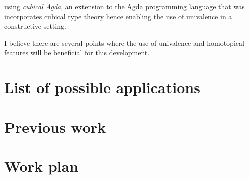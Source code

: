 \documentclass[11pt]{article}
\begin{document}
using \emph{cubical Agda}, an extension to the Agda programming language that was
incorporates cubical type theory hence enabling the use of univalence in a constructive
setting.

I believe there are several points where the use of univalence and homotopical features
will be beneficial for this development.


\section{List of possible applications}

\section{Previous work}

\section{Work plan}



\end{document}
